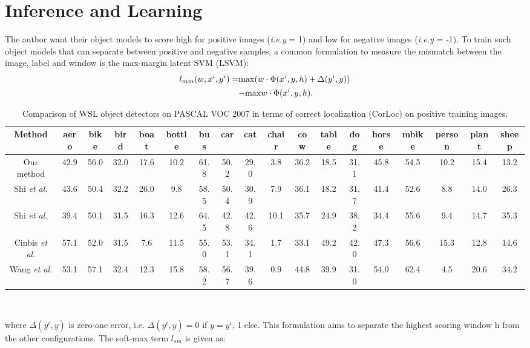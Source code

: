 \documentclass[10pt,twocolumn,letterpaper]{article}
\begin{document}
\section{Inference and Learning}
The author want their object models to score high for positive images ({\em i.e.y} = 1) and low for negative images ({\em i.e.y} = -1). To train such object models that can separate between positive and negative samples, a common formulation to measure the mismatch between the image, label and window is the max-margin latent SVM (LSVM):
\begin{equation}
\begin{aligned}
l_{mm}(w,x^i,y^i)=&{\rm max}(w\cdot\Phi(x^i,y,h)+\Delta(y^i,y)) \\
&{\rm -max}w\cdot\Phi(x^i,y,h).
\end{aligned}\label{eq1}
\end{equation}
\begin{table*}[htbp]
\scriptsize
\begin{tabular}{|c|ccccccccccccccccc|}
\hline
Method & aero & bike & bird & boat & bottle & bus & car & cat & chair & cow & table & dog & horse & mbike & person & plant & sheep\\
\hline
\hline
Our method & 42.9 & 56.0 & 32.0 & 17.6 & 10.2 & 61.8 & 50.2 & 29.0 & 3.8 & 36.2 & 18.5 & 31.1 & 45.8 & 54.5 & 10.2 & 15.4 & 13.2 \\
Shi \emph{et al.}\cite{Shi2014Bayesian} & 43.6 & 50.4 & 32.2 & 26.0 & 9.8 & 58.5 & 50.4 & 30.9 & 7.9 & 36.1 & 18.2 & 31.7 & 41.4 & 52.6 & 8.8 & 14.0 & 26.3 \\
Shi \emph{et al.}\cite{Zhiyuan2012Transfer} & 39.4 & 50.1 & 31.5 & 16.3 & 12.6 & 64.5 & 42.8 & 42.6 & 10.1 & 35.7 & 24.9 & 38.2 & 34.4 & 55.6 & 9.4 & 14.7 & 35.3 \\
Cinbis \emph{et al.}\cite{Cinbis2014Multi} & 57.1 & 52.0 & 31.5 & 7.6 & 11.5 & 55.0 & 53.1 & 34.1 & 1.7 & 33.1 & 49.2 & 42.0 & 47.3 & 56.6 & 15.3 &12.8 & 14.6 \\
Wang \emph{et al.}\cite{Wang2014Weakly} & 53.1 & 57.1 & 32.4 & 12.3 & 15.8 & 58.2 & 56.7 & 39.6 & 0.9 & 44.8 & 39.9 & 31.0 & 54.0 & 62.4 & 4.5 & 20.6 & 34.2 \\
\hline
\end{tabular} \\
\caption{Comparison of WSL object detectors on PASCAL VOC 2007 in terms of correct localization (CorLoc) on positive training images.}
\label{tab1}
\end{table*}
where $\Delta(y^i,y)$ is zero-one error, i.e. $\Delta(y^i,y) = 0$  if $y=y^i$, 1 else. This formulation aims to separate the highest scoring window h from the other configurations. The soft-max term $l_{sm}$ is given as:
\end{document}
